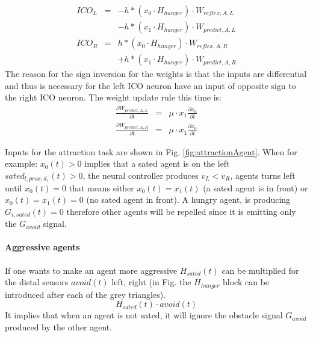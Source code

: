 \begin{eqnarray}
ICO_{L}&=&-h \ast ( x_0 \cdot H_{hunger}) \cdot W_{reflex,A,L} \\ \nonumber
       & &-h \ast ( x_1 \cdot H_{hunger}) \cdot W_{predict,A,L} \label{eq:ICO:L2}\\
ICO_{R}&=& h \ast ( x_0 \cdot H_{hunger}) \cdot W_{reflex,A,R} \\ \nonumber
       & &+h \ast ( x_1 \cdot H_{hunger}) \cdot W_{predict,A,R} \label{eq:ICO:R2}
\end{eqnarray}
The reason for the sign inversion for the weights is that the inputs
are differential and thus is necessary for the left ICO neuron have
an input of opposite sign to the right ICO neuron.
The weight update rule this time is:
\begin{eqnarray}
\frac{\partial W_{predict,A,L}}{\partial t}&=& \mu \cdot x_1 \frac{\partial x_0}{\partial t}\\
\frac{\partial W_{predict,A,R}}{\partial t}&=& \mu \cdot x_1 \frac{\partial x_0}{\partial t}
\end{eqnarray}

Inputs for the attraction task are shown in Fig. \ref{fig:attractionAgent}.
When for example:  $x_{0}(t)>0$ implies that a sated agent is on the left
$sated_{l,prox,d_{1}}(t)>0$, the neural controller produces $v_{L}<v_{R}$,
agents turns left until $x_{0}(t)=0$ that means either $x_{0}(t)=x_{1}(t)$
(a sated agent is in front) or $x_{0}(t)=x_{1}(t)=0$ (no sated agent in front).
A hungry agent, is producing $G_{i,sated}(t)=0$ therefore other agents will be
 repelled since it is emitting only the $G_{avoid}$ signal.

\paragraph{Aggressive agents}
If one wants to make an agent more aggressive $H_{sated}(t)$ can be multiplied for the
distal sensors $avoid(t)$ left, right (in Fig.\label{fig:avoid} the $H_{hunger}$
block can be introduced after each of the grey triangles). 
\begin{equation}
H_{sated}(t)\cdot avoid(t)  \label{eq:aggressive}
\end{equation}
It implies that when an agent is not sated, it will ignore the obstacle
signal $G_{avoid}$ produced by the other agent.

